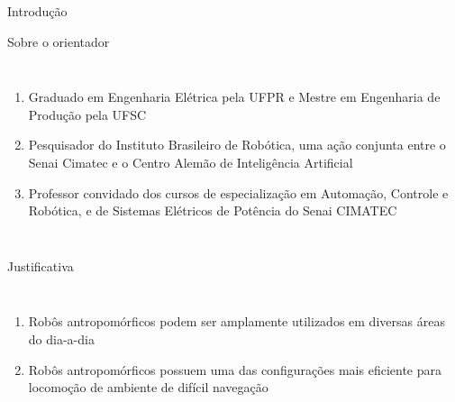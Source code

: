\begin{frame}[t]{Introdução} 
    \transdissolve[duration=0.5]

    Sobre o orientador
        \begin{columns}[t]
                \begin{enumerate}
                    \item Graduado em Engenharia Elétrica pela UFPR e Mestre em Engenharia de Produção pela UFSC
                    \item Pesquisador do Instituto Brasileiro de Robótica, uma ação conjunta entre o Senai Cimatec e o Centro Alemão de Inteligência Artificial
                    \item Professor convidado dos cursos de especialização em Automação, Controle e Robótica, e de Sistemas Elétricos de Potência do Senai CIMATEC
                \end{enumerate}
        \end{columns}
\end{frame}
\begin{frame}[t]{Justificativa} 
    \transdissolve[duration=0.5]
        \begin{columns}[t]
                \begin{enumerate}
                    \item Robôs antropomórficos podem ser amplamente utilizados em diversas áreas do dia-a-dia
                    \item Robôs antropomórficos possuem uma das configurações mais eficiente para locomoção de ambiente de difícil navegação
                \end{enumerate}
        \end{columns}
\end{frame}
